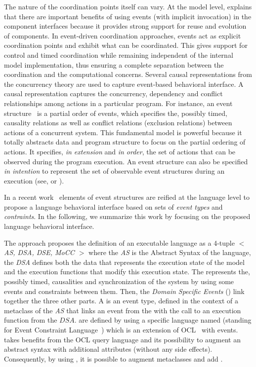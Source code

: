 The nature of the coordination points itself can vary. At the model level, \cite{garlansoftarchbib} explains that there are important benefits of using events (with implicit invocation) in the component interfaces because it provides strong support for reuse and evolution of components. In event-driven coordination approaches, events act as explicit coordination points and exhibit what can be coordinated. This gives support for control and timed coordination while remaining independent of the internal model implementation, thus ensuring a complete separation between the coordination and the computational concerns. Several causal representations from the concurrency theory are used to capture event-based behavioral interface. A causal representation captures the concurrency, dependency and conflict relationships among actions in a particular program. For instance, an event structure~\cite{eventStructures} is a partial order of events, which specifies the, possibly timed, causality relations as well as conflict relations (\ie exclusion relations) between actions of a concurrent system. This fundamental model is powerful because it totally abstracts data and program structure to focus on the partial ordering of actions. It specifies, \emph{in extension} and \emph{in order}, the set of actions that can be observed during the program execution. An event structure can also be specified \emph{in intention} to represent the set of observable event structures during an execution (see, \eg\cite{ccslbib} or \cite{tagmachinebib}).

In a recent work~\cite{sle13-combemale} elements of event structures are reified at the language level to propose a language behavioral interface based on sets of \emph{event types} and \emph{contraints}. In the following, we summarize this work by focusing on the proposed language behavioral interface. 

The approach proposes the definition of an executable language as a 4-tuple \emph{$<$ AS, DSA, DSE, MoCC $>$} where the \emph{AS} is the Abstract Syntax of the language, the \emph{DSA} defines both the data that represents the execution state of the model and the execution functions that modify this execution state. The \mocc represents the, possibly timed, causalities and synchronization of the system by using some events and constraints between them. Then, the \emph{Domain Specific Events} (\dse) link together the three other parts. A \dse is an event type, defined in the context of a metaclass of the \emph{AS} that links an event from the \mocc with the call to an execution function from the $DSA$. \dse are defined by using a specific language named \ecl (standing for Event Constraint Language~\cite{eclbib}) which is an extension of OCL~\cite{omgocl2bib} with events. \ecl takes benefits from the OCL query language and its possibility to augment an abstract syntax with additional attributes (without any side effects). Consequently, by using \ecl, it is possible to augment \as metaclasses and add \dse. 

